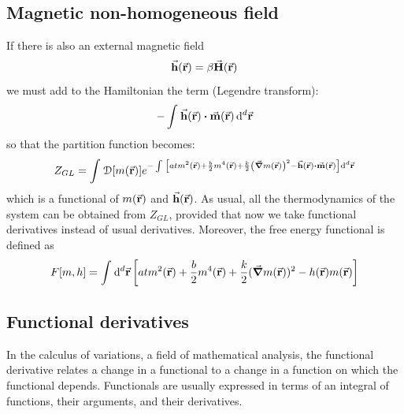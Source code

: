 \documentclass[../../Main/Main.tex]{subfiles}
\begin{document}
\subsection{Magnetic non-homogeneous field}
If there is also an external magnetic field
\begin{equation*}
  \va{h} ( \va{r}) = \beta \va{H} ( \va{r})
\end{equation*}
we must add to the Hamiltonian the term (Legendre transform):
\begin{equation*}
  - \int_{}^{}  \va{h} (\va{r}) \vdot \va{m} (\va{r}) \dd[d]{\va{r}}
\end{equation*}
so that the partition function becomes:
\begin{equation}
  Z_{GL} = \int_{}^{} \mathcal{D} \qty[m(\va{r})]  e^{-   \int_{}^{}  \qty[a t m^2 (\va{r}) + \frac{b}{2} m^4 (\va{r}) + \frac{k}{2} \qty(\va{\grad } m (\va{r}))^2 -  \va{h} (\va{r}) \vdot \va{m} (\va{r}) ] \dd[d]{\va{r}}   }
\end{equation}
which is a functional of \( m(\va{r}) \)  and \( \va{h}(\va{r}) \). As usual, all the thermodynamics of the system can be obtained from  \( Z_{GL} \), provided that now we take functional derivatives instead of usual derivatives.
Moreover, the free energy functional is defined as
\begin{equation}
  F [m,h] = \int_{}^{} \dd[d]{\va{r}} \qty[a t m^2 (\va{r}) + \frac{b}{2} m^4 (\va{r}) + \frac{k}{2} (\va{\grad }  m (\va{r}))^2 - h(\va{r})m(\va{r})]
  \label{eq:17_10}
\end{equation}


\subsection{Functional derivatives}
In the calculus of variations, a field of mathematical analysis, the functional derivative relates a change in a functional to a change in a function on which the functional depends. Functionals are usually expressed in terms of an integral of functions, their arguments, and their derivatives.
\end{document}
